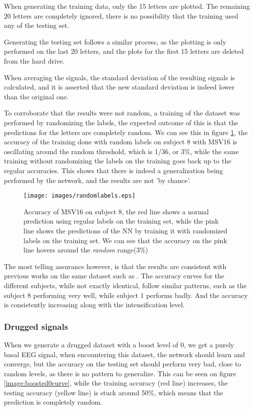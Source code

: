 \documentclass[conference]{IEEEtran}
\begin{document}
When generating the training data, only the 15 letters are plotted. The remaining 20 letters are completely ignored, there is no possibility that the training used any of the testing set. 

Generating the testing set follows a similar process, as the plotting is only performed on the last 20 letters, and the plots for the first 15 letters are deleted from the hard drive.

When averaging the signals, the standard deviation of the resulting signals is calculated, and it is asserted that the new standard deviation is indeed lower than the original one.

To corroborate that the results were not random, a training of the dataset was performed by randomizing the labels, the expected outcome of this is that the predictions for the letters are completely random. We can see this in figure \ref{image:randomlabels}, the accuracy of the training done with random labels on subject 8 with MSV16 is oscillating around the random threshold, which is 1/36, or 3\%, while the same training without randomizing the labels on the training goes back up to the regular accuracies. This shows that there is indeed a generalization being performed by the network, and the results are not 'by chance'.

\begin{figure}[htb]
  \centering
  \texttt{[image: images/randomlabels.eps]}
  \caption[Random Labels Accuracy]{Accuracy of MSV16 on subject 8, the red line shows a normal prediction using regular labels on the training set, while the pink line shows the predictions of the NN by training it with randomized labels on the training set. We can see that the accuracy on the pink line hovers around the \emph{random} range(3\%)}
  \label{image:randomlabels}
\end{figure}

The most telling assurance however, is that the results are consistent with previous works on the same dataset such as \cite{ramele2019histogram}. The accuracy curves for the different subjects, while not exactly identical, follow similar patterns, such as the subject 8 performing very well, while subject 1 performs badly. And the accuracy is consistently increasing along with the intensification level.


\subsubsection{Drugged signals}
When we generate a drugged dataset with a boost level of 0, we get a purely basal EEG signal, when encountering this dataset, the network should learn and converge, but the accuracy on the testing set should perform very bad, close to random levels, as there is no pattern to generalize. This can be seen on figure \ref{image:boosted0curve}, while the training accuracy (red line) increases, the testing accuracy (yellow line) is stuck around 50\%, which means that the prediction is completely random.
\end{document}
